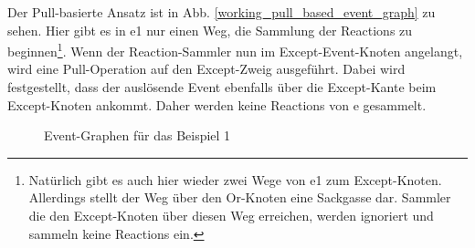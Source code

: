 Der Pull-basierte Ansatz ist in Abb. \ref{working_pull_based_event_graph} zu
sehen. Hier gibt es in e1 nur einen Weg, die Sammlung der Reactions zu
beginnen\footnote{Natürlich gibt es auch hier wieder zwei Wege von e1 zum
Except-Knoten. Allerdings stellt der Weg über den Or-Knoten eine Sackgasse
dar. Sammler die den Except-Knoten über diesen Weg erreichen, werden ignoriert
und sammeln keine Reactions ein.}. Wenn der Reaction-Sammler nun im
Except-Event-Knoten angelangt, wird eine Pull-Operation auf den Except-Zweig ausgeführt. Dabei  wird
festgestellt, dass der auslösende Event ebenfalls über die Except-Kante beim 
Except-Knoten ankommt. Daher werden keine Reactions von e gesammelt.


 


\begin{figure}[htp]
\centering
{}
\caption{Event-Graphen für das Beispiel 1}
\end{figure}

